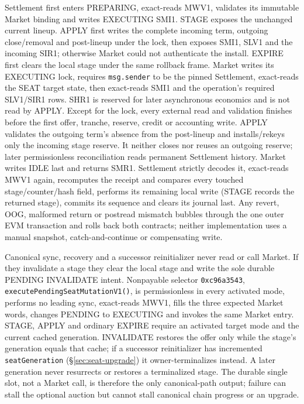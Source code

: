 \documentclass[a4paper,11pt]{article}
\newcommand{\code}[1]{\nolinkurl{#1}}
\begin{document}
Settlement first enters PREPARING, exact-reads MWV1, validates its immutable
Market binding and writes EXECUTING SMI1.  STAGE exposes the unchanged current
lineup.  APPLY first writes the complete incoming term, outgoing close/removal
and post-lineup under the lock, then exposes SMI1, SLV1 and the incoming SIR1;
otherwise Market could not authenticate the install.  EXPIRE first clears the
local stage under the same rollback frame.  Market writes its EXECUTING lock,
requires \code{msg.sender} to be the pinned Settlement, exact-reads the SEAT
target state, then exact-reads SMI1 and the
operation's required SLV1/SIR1 rows.  SHR1 is reserved for later asynchronous
economics and is not read by APPLY.  Except for the lock, every external read and
validation finishes before the first offer, tranche, reserve, credit or
accounting write.  APPLY validates the outgoing term's absence from the
post-lineup and installs/rekeys only the incoming stage reserve.  It neither
closes nor reuses an outgoing reserve; later permissionless reconciliation
reads permanent Settlement history.  Market writes IDLE last and returns SMR1.  Settlement strictly
decodes it, exact-reads MWV1 again, recomputes the receipt and compares every
touched stage/counter/hash field, performs its remaining local write (STAGE
records the returned stage), commits its sequence and clears its journal last.
Any revert, OOG, malformed return or postread mismatch bubbles through the one
outer EVM transaction and rolls back both contracts; neither implementation
uses a manual snapshot, catch-and-continue or compensating write.

Canonical sync, recovery and a successor reinitializer never read or call
Market.  If they invalidate a stage they clear the local stage and write the
sole durable PENDING INVALIDATE intent.  Nonpayable selector \code{0xc96a3543},
\code{executePendingSeatMutationV1()}, is permissionless in every activated
mode, performs no leading sync, exact-reads MWV1, fills the three expected
Market words, changes PENDING to EXECUTING and invokes the same Market entry.
STAGE, APPLY and ordinary EXPIRE require an activated target mode and the
current cached generation.  INVALIDATE restores the offer only while the
stage's generation equals that cache; if a successor reinitializer has
incremented \code{seatGeneration} (\S\ref{sec:seat-upgrade}) it
owner-terminalizes instead.  A later generation never resurrects or restores a
terminalized stage.  The durable single slot, not a Market call, is therefore
the only canonical-path output; failure can stall the optional auction but
cannot stall canonical chain progress or an upgrade.
\end{document}
